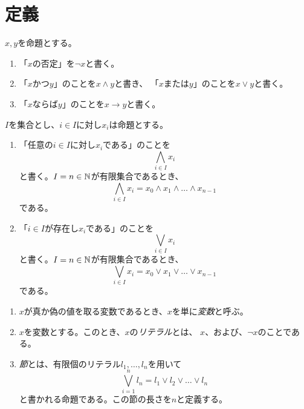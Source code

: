 
\section{定義}

\begin{nota}
 $x, y$を命題とする。
 \begin{enumerate}[1.]
  \item 「$x$の否定」を$\lnot x$と書く。
  \item 「$x$かつ$y$」のことを$x \land y$と書き、
        「$x$または$y$」のことを$x \lor y$と書く。
  \item 「$x$ならば$y$」のことを$x \rightarrow y$と書く。
 \end{enumerate}
\end{nota}

\begin{nota}
 $I$を集合とし、$i \in I$に対し$x_i$は命題とする。
 \begin{enumerate}[1.]
  \item 「任意の$i \in I$に対し$x_i$である」のことを
        \[
         \bigwedge_{i \in I} x_i
        \]
        と書く。$I = n \in \mathbb{N}$が有限集合であるとき、
        \[
         \bigwedge_{i \in I} x_i = x_0 \land x_1 \land \dots \land x_{n-1}
        \]
        である。
  \item 「$i \in I$が存在し$x_i$である」のことを
        \[
         \bigvee_{i \in I} x_i
        \]
        と書く。$I = n \in \mathbb{N}$が有限集合であるとき、
        \[
         \bigvee_{i \in I} x_i = x_0 \lor x_1 \lor \dots \lor x_{n-1}
        \]
        である。
 \end{enumerate}
\end{nota}

\begin{defn}
 \begin{enumerate}[1.]
  \item $x$が真か偽の値を取る変数であるとき、$x$を単に\emph{変数}と呼ぶ。
  \item $x$を変数とする。このとき、$x$の\emph{リテラル}とは、
        $x$、および、$\lnot x$のことである。
  \item \emph{節}とは、有限個のリテラル$l_1, \dots, l_n$を用いて
        \[
         \bigvee_{i = 1}^n l_n = l_1 \lor l_2 \lor \dots \lor l_n
        \]
        と書かれる命題である。この節の長さを$n$と定義する。
 \end{enumerate}
\end{defn}

